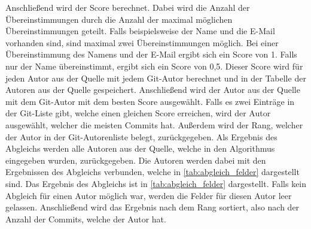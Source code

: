 Anschließend wird der Score berechnet.
Dabei wird die Anzahl der Übereinstimmungen durch die Anzahl der maximal möglichen Übereinstimmungen geteilt.
Falls beispielsweise der Name und die E-Mail vorhanden sind, sind maximal zwei Übereinstimmungen möglich.
Bei einer Übereinstimmung des Namens und der E-Mail ergibt sich ein Score von 1.
Falls nur der Name übereinstimmt, ergibt sich ein Score von 0,5.
Dieser Score wird für jeden Autor aus der Quelle mit jedem Git-Autor berechnet und in der Tabelle der Autoren aus der Quelle gespeichert.
Anschließend wird der Autor aus der Quelle mit dem Git-Autor mit dem besten Score ausgewählt.
Falls es zwei Einträge in der Git-Liste gibt, welche einen gleichen Score erreichen, wird der Autor ausgewählt, welcher die meisten Commits hat.
Außerdem wird der Rang, welcher der Autor in der Git-Autorenliste belegt, zurückgegeben.
Als Ergebnis des Abgleichs werden alle Autoren aus der Quelle, welche in den Algorithmus eingegeben wurden, zurückgegeben.
Die Autoren werden dabei mit den Ergebnissen des Abgleichs verbunden, welche in \autoref{tab:abgleich_felder} dargestellt sind.
Das Ergebnis des Abgleichs ist in \autoref{tab:abgleich_felder} dargestellt.
Falls kein Abgleich für einen Autor möglich war, werden die Felder für diesen Autor leer gelassen.
Anschließend wird das Ergebnis nach dem Rang sortiert, also nach der Anzahl der Commits, welche der Autor hat.
